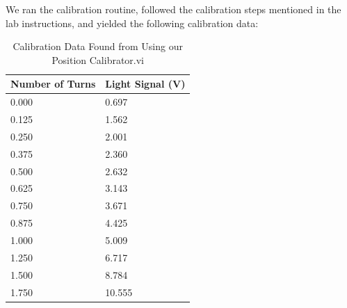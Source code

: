 \documentclass{article}
\begin{document}
    We ran the calibration routine, followed the calibration steps mentioned in the lab instructions, and yielded the following calibration data:
    \begin{table}[H]
        \centering
        \caption{Calibration Data Found from Using our Position Calibrator.vi}
        \label{my-label}
        \begin{tabular}{ll}
        \textbf{Number of Turns} & \textbf{Light Signal (V)} \\ \hline
        0.000 & 0.697 \\
        0.125 & 1.562 \\
        0.250 & 2.001 \\
        0.375 & 2.360 \\
        0.500 & 2.632 \\
        0.625 & 3.143 \\
        0.750 & 3.671 \\
        0.875 & 4.425 \\
        1.000 & 5.009 \\
        1.250 & 6.717 \\
        1.500 & 8.784 \\
        1.750 & 10.555
        \end{tabular}
        \end{table}

\end{document}
